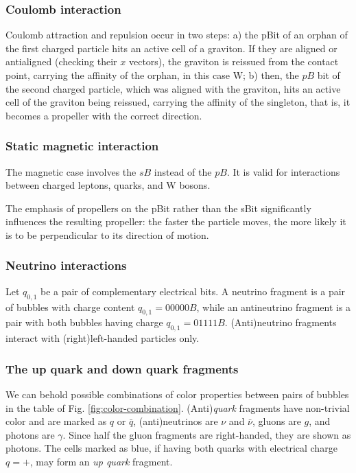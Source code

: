\documentclass[12pt]{article}
\begin{document}
\subsubsection{Coulomb interaction} \label{subsec:Coulomb-interaction}

Coulomb attraction and repulsion occur in two steps: a) the pBit of an orphan of the first charged particle hits an active cell of a graviton. If they are aligned or antialigned (checking their $x$ vectors), the graviton is reissued from the contact point, carrying the affinity of the orphan, in this case W; b) then, the $pB$ bit of the second charged particle, which was aligned with the graviton, hits an active cell of the graviton being reissued, carrying the affinity of the singleton, that is, it becomes a propeller with the correct direction.

\subsubsection{Static magnetic interaction}

The magnetic case involves the $sB$ instead of the $pB$. It is valid for interactions between charged leptons, quarks, and W bosons.

The emphasis of propellers on the pBit rather than the sBit significantly influences the resulting propeller: the faster the particle moves, the more likely it is to be perpendicular to its direction of motion.

\subsubsection{Neutrino interactions}

Let $q_{0,1}$ be a pair of complementary electrical bits. A neutrino fragment is a pair of bubbles with charge content $q_{0,1} = 00000B$, while an antineutrino fragment is a pair with both bubbles having charge $q_{0,1} = 01111B$. (Anti)neutrino fragments interact with (right)left-handed particles only.

\subsubsection{The up quark and down quark fragments}

We can behold possible combinations of color properties between pairs of bubbles in the table of Fig. \ref{fig:color-combination}. (Anti)\emph{quark} fragments have non-trivial color and are marked as $q$ or $\bar{q}$, (anti)neutrinos are $\nu$ and $\bar{\nu}$, gluons are $g$, and photons are $\gamma$. Since half the gluon fragments are right-handed, they are shown as photons. The cells marked as blue, if having both quarks with electrical charge $q=+$, may form an \emph{up quark}
fragment. 
\end{document}
